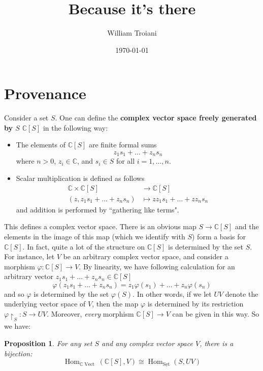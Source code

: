 \documentclass[12pt]{article}
\title{Because it's there}
\author{William Troiani}
\date{\today}
\theoremstyle{plain}
\newtheorem{proposition}[thm]{Proposition}
\theoremstyle{definition}
\newcommand{\bb}[1]{\mathbb{#1}}
\newcommand{\lto}{\longrightarrow}
\begin{document}
	\maketitle
\section{Provenance}

Consider a set $S$. One can define the \textbf{complex vector space freely generated by $S$} $\bb{C}[S]$ in the following way:
\begin{itemize}
	\item The elements of $\bb{C}[S]$ are finite formal sums
	\begin{equation}
		z_1 s_1 + \ldots + z_n s_n
		\end{equation}
	where $n > 0$, $z_i \in \bb{C}$, and $s_i \in S$ for all $i = 1, \ldots, n$.
	\item Scalar multiplication is defined as follows
	\begin{align*}
		\bb{C} \times \bb{C}[S] &\lto \bb{C}[S]\\
		(z,z_1 s_1 + \ldots + z_n s_n) &\longmapsto zz_1 s_1 + \ldots + zz_n s_n
		\end{align*}
	and addition is performed by ``gathering like terms".
	\end{itemize}
This defines a complex vector space. There is an obvious map $S \lto \bb{C}[S]$ and the elements in the image of this map (which we identify with $S$) form a basis for $\bb{C}[S]$. In fact, quite a lot of the structure on $\bb{C}[S]$ is determined by the set $S$. For instance, let $V$ be an arbitrary complex vector space, and consider a morphism $\varphi: \bb{C}[S] \lto V$. By linearity, we have following calculation for an arbitrary vector $z_1 s_1 + \ldots + z_n s_n \in \bb{C}[S]$
\begin{equation}
	\varphi(z_1 s_1 + \ldots + z_n s_n) = z_1 \varphi(s_1) + \ldots + z_n \varphi(s_n)
	\end{equation}
and so $\varphi$ is determined by the set $\varphi(S)$. In other words, if we let $UV$ denote the underlying vector space of $V$, then the map $\varphi$ is determined by its restriction $\varphi\restriction_{S}: S \lto UV$. Moreover, \emph{every} morphism $\bb{C}[S] \lto V$ can be given in this way. So we have:
\begin{proposition}
	For any set $S$ and any complex vector space $V$, there is a bijection:
	\begin{equation}\label{eq:hom_set_adj}
		\operatorname{Hom}_{\bb{C}\operatorname{Vect}}(\bb{C}[S], V) \cong \operatorname{Hom}_{\underline{\operatorname{Set}}}(S, UV)
		\end{equation}
	\end{proposition}
\end{document}
